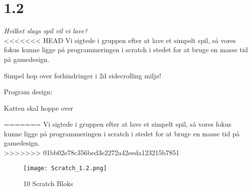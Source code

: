 \section{1.2}

\textit{Hvilket slags spil vil vi lave?}\\
<<<<<<< HEAD
Vi sigtede i gruppen efter at lave et simpelt spil, så vores fokus kunne ligge på programmeringen i scratch i stedet for at bruge en masse tid på gamedesign.

Simpel hop over forhindringer i 2d sidecrolling miljø!

Program design:

Katten skal hoppe over 

=======
Vi sigtede i gruppen efter at lave et simpelt spil,
så vores fokus kunne ligge på programmeringen i scratch
i stedet for at bruge en masse tid på gamedesign.\\
>>>>>>> 01bb02e78c356bed3e2272a42eeda123215b7851

\begin{figure}[ht]
	\centering
	\texttt{[image: Scratch\_1.2.png]}
	\caption{{10 Scratch Bloks}}
	\label{fig:Version_0.1}
\end{figure}
